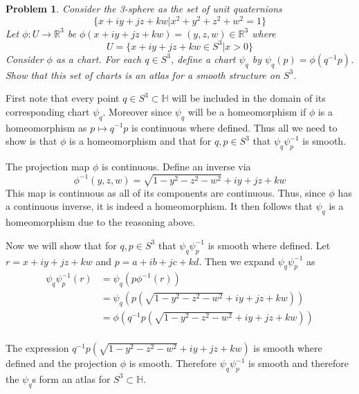\documentclass[10pt]{article}
\newcommand{\sk}{\vskip 10mm}
\newcommand{\bb}[1]{\mathbb{#1}}
\theoremstyle{plain}
\newtheorem{problem}{Problem}
\theoremstyle{remark}
\begin{document}
\begin{problem}
  Consider the 3-sphere as the set of unit quaternions
  \[ \{x+iy+jz+kw|x^2+y^2+z^2+w^2=1\} \]
  Let $\phi:U\rightarrow\bb{R}^3$ be $\phi(x+iy+jz+kw)=(y,z,w)\in\bb{R}^3$ where
  \[ U=\{x+iy+jz+kw\in S^3|x>0\} \]
  Consider $\phi$ as a chart. For each $q\in S^3$, define a chart $\psi_q$ by
  $\psi_q(p)=\phi(q^{-1}p)$. Show that this set of charts is an atlas for a
  smooth structure on $S^3$.
\end{problem}

First note that every point $q\in S^3\subset\bb{H}$ will be included
in the domain of its corresponding chart $\psi_q$. Moreover
since $\psi_q$ will be a homeomorphism if $\phi$ is a homeomorphism as $p\mapsto q^{-1}p$
is continuous where defined. Thus all we need to show is that $\phi$ is 
a homeomorphism and that for $q,p\in S^3$ that $\psi_q\psi_p^{-1}$ is smooth.

The projection map $\phi$ is continuous. Define an inverse via
\[ \phi^{-1}(y,z,w)=\sqrt{1-y^2-z^2-w^2}+iy+jz+kw \]
This map is continuous as all of its components are continuous. Thus,
since $\phi$ has a continuous inverse, it is indeed a homeomorphism.
It then follows that $\psi_q$ is a homeomorphism due to the reasoning above.

Now we will show that for $q,p\in S^3$ that $\psi_q\psi_p^{-1}$ is smooth where
defined. Let $r=x+iy+jz+kw$ and $p=a+ib+jc+kd$.
Then we expand $\psi_q\psi_p^{-1}$ as
\begin{align*}
  \psi_q\psi_p^{-1}(r)&=\psi_q(p\phi^{-1}(r))\\
                &= \psi_q(p(\sqrt{1-y^2-z^2-w^2}+iy+jz+kw))\\
                &= \phi(q^{-1}p(\sqrt{1-y^2-z^2-w^2}+iy+jz+kw))\\
\end{align*}

The expression $q^{-1}p(\sqrt{1-y^2-z^2-w^2}+iy+jz+kw)$ is smooth where defined
and the projection $\phi$ is smooth. Therefore $\psi_q\psi_p^{-1}$ is smooth and
therefore the $\psi_q$s form an atlas for $S^3\subset\bb{H}$.

\sk
\end{document}
